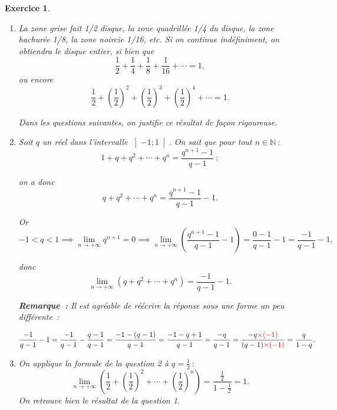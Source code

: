 \documentclass[10pt]{article}
\newtheorem{exo}{Exercice}
\begin{document}
\begin{exo}

\begin{enumerate}
\item La zone grise fait 1/2 disque, la zone quadrillée 1/4 du disque, la zone hachurée 1/8, la zone noircie 1/16, etc. Si on continue indéfiniment, on obtiendra le disque entier, si bien que
\[\frac{1}{2}+\frac{1}{4}+\frac{1}{8}+\frac{1}{16}+\cdots =1,\] ou encore
\[\frac{1}{2}+\left(\frac{1}{2}\right)^2+\left(\frac{1}{2}\right)^3+\left(\frac{1}{2}\right)^4+\cdots =1.\]

Dans les questions suivantes, on justifie ce résultat de façon rigoureuse.

\item Soit $q$ un réel dans l'intervalle $\left]-1;1\right[.$ On sait  que pour tout $n\in\mathbb{N}~:$
\[1+q+q^2+\cdots+q^n=\dfrac{q^{n+1}-1}{q-1}~;\]

on a donc
\[q+q^2+\cdots+q^n=\dfrac{q^{n+1}-1}{q-1}-1.\]

Or
\[-1<q<1\implies \lim\limits_{n\to +\infty} q^{n+1} = 0\implies \lim\limits_{n\to +\infty} \left(\dfrac{q^{n+1}-1}{q-1}-1\right)=\dfrac{0-1}{q-1}-1=\dfrac{-1}{q-1}-1,\]

donc \[\lim\limits_{n\to +\infty}\left(q+q^2+\cdots+q^n\right)=\dfrac{-1}{q-1}-1.\]

\medskip

\textbf{Remarque~:} Il est agréable de réécrire la réponse sous une forme un peu différente~:

\[\dfrac{-1}{q-1}-1=\dfrac{-1}{q-1}-\dfrac{q-1}{q-1}=\dfrac{-1-(q-1)}{q-1}=\dfrac{-1-q+1}{q-1}=\dfrac{-q}{q-1}=\dfrac{-q\textcolor{red}{\times (-1)}}{(q-1)\textcolor{red}{\times (-1)}}=\dfrac{q}{1-q}.\]

\item On applique la formule de la question 2 à $q=\frac{1}{2}~:$
\[\lim\limits_{n\to +\infty}\left(\frac{1}{2}+\left(\frac{1}{2}\right)^2+\cdots+\left(\frac{1}{2}\right)^n\right)=\dfrac{\frac{1}{2}}{1-\frac{1}{2}}=1.\] On retrouve bien le résultat de la question 1.
\end{enumerate}

\end{exo}
\end{document}
